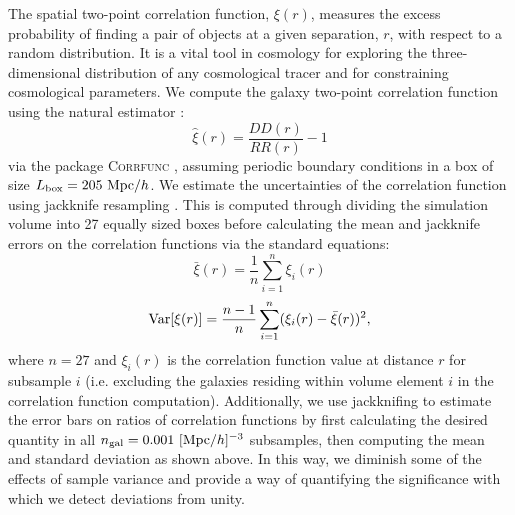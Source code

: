 \documentclass[fleqn,usenatbib]{mnras}
\begin{document}
The spatial two-point correlation function, $\xi(r)$, measures the excess probability of finding a pair of objects at a given separation, $r$, with respect to a random distribution. It is a vital tool in cosmology for exploring the three-dimensional distribution of any cosmological tracer and for constraining cosmological parameters. We compute the galaxy two-point correlation function using the natural estimator \citep{1980lssu.book.....P}:
\begin{equation}
    \hat \xi(r) = \frac{DD(r)}{RR(r)}-1 
\end{equation} 
via the package \textsc{Corrfunc} \citep{2020MNRAS.491.3022S}, assuming periodic boundary conditions in a box of size $L_{\rm box} = 205 \ {\rm Mpc}/h$. We estimate the uncertainties of the correlation function using jackknife resampling \citep{2009MNRAS.396...19N}. This is computed through dividing the simulation volume into 27 equally sized boxes before calculating the mean and jackknife errors on the correlation functions via the standard equations:
\begin{equation}
    {\bar \xi(r)}=\frac{1}{n}\sum_{i=1}^{n} {\xi}_i(r)
    \end{equation}
    \begin{equation}
    {\rm Var}[{\xi(r)}]=\frac{n-1}{n} \sum_{i=1}^{n} ({\xi_i(r)} - {\bar \xi(r)})^2 ,
\end{equation}
where $n = 27$ and ${\xi_i(r)}$ is the correlation function value at distance $r$ for subsample $i$ (i.e. excluding the galaxies residing within volume element $i$ in the correlation function computation). Additionally, we use jackknifing to estimate the error bars on ratios of correlation functions by first calculating the desired quantity in all $n_{\rm gal} = 0.001 \ [{\rm Mpc}/h]^{-3}$ subsamples, then computing the mean and standard deviation as shown above. In this way, we diminish some of the effects of sample variance and provide a way of quantifying the significance with which we detect deviations from unity.
\end{document}

